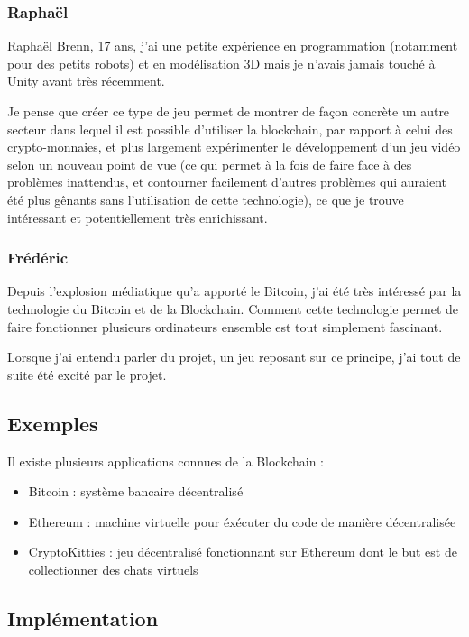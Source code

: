 \documentclass{article}
\begin{document}
\subsubsection{Raphaël}

Raphaël Brenn, 17 ans, j'ai une petite expérience en programmation (notamment pour des petits robots) et en modélisation 3D mais je n'avais jamais touché à Unity avant très récemment.

Je pense que créer ce type de jeu permet de montrer de façon concrète un autre secteur dans lequel il est possible d'utiliser la blockchain, par rapport à celui des crypto-monnaies, et plus largement expérimenter le développement d'un jeu vidéo selon un nouveau point de vue (ce qui permet à la fois de faire face à des problèmes inattendus, et contourner facilement d'autres problèmes qui auraient été plus gênants sans l'utilisation de cette technologie), ce que je trouve intéressant et 
potentiellement très enrichissant.

\subsubsection{Frédéric}

Depuis l’explosion médiatique qu’a apporté le Bitcoin, j’ai été très intéressé par la technologie du Bitcoin et de la Blockchain. Comment cette technologie permet de faire fonctionner plusieurs ordinateurs ensemble est tout simplement fascinant. 

Lorsque j’ai entendu parler du projet, un jeu reposant sur ce principe, j’ai tout de suite été excité par le projet.

\subsection{Exemples}

Il existe plusieurs applications connues de la Blockchain :
\begin{itemize}
    \item Bitcoin : système bancaire décentralisé
    \item Ethereum : machine virtuelle pour éxécuter du code de manière décentralisée
    \item CryptoKitties : jeu décentralisé fonctionnant sur Ethereum dont le but est de collectionner des chats virtuels
\end{itemize}

\subsection{Implémentation}
\end{document}
